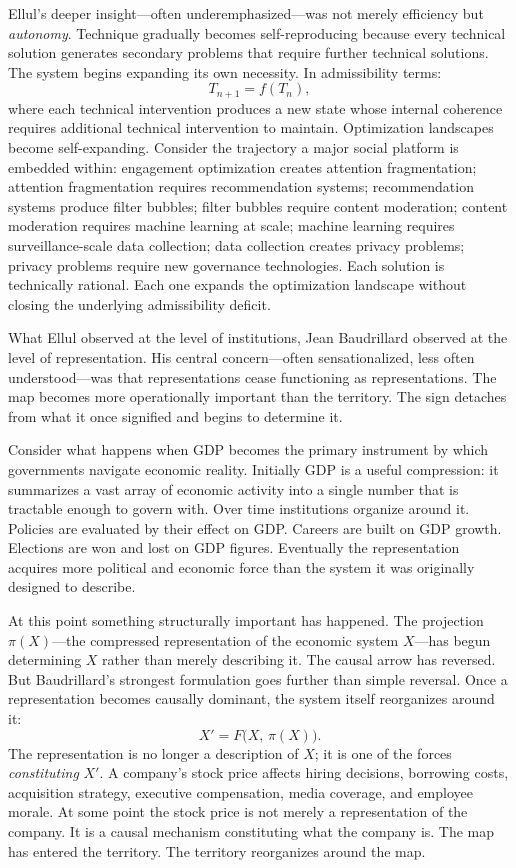 \documentclass[11pt, letterpaper]{article}
\begin{document}
Ellul's deeper insight---often underemphasized---was not merely efficiency but \emph{autonomy}. Technique gradually becomes self-reproducing because every technical solution generates secondary problems that require further technical solutions. The system begins expanding its own necessity. In admissibility terms:
\[
  T_{n+1} = f(T_n),
\]
where each technical intervention produces a new state whose internal coherence requires additional technical intervention to maintain. Optimization landscapes become self-expanding. Consider the trajectory a major social platform is embedded within: engagement optimization creates attention fragmentation; attention fragmentation requires recommendation systems; recommendation systems produce filter bubbles; filter bubbles require content moderation; content moderation requires machine learning at scale; machine learning requires surveillance-scale data collection; data collection creates privacy problems; privacy problems require new governance technologies. Each solution is technically rational. Each one expands the optimization landscape without closing the underlying admissibility deficit.

What Ellul observed at the level of institutions, Jean Baudrillard observed at the level of representation. His central concern---often sensationalized, less often understood---was that representations cease functioning as representations. The map becomes more operationally important than the territory. The sign detaches from what it once signified and begins to determine it.

Consider what happens when GDP becomes the primary instrument by which governments navigate economic reality. Initially GDP is a useful compression: it summarizes a vast array of economic activity into a single number that is tractable enough to govern with. Over time institutions organize around it. Policies are evaluated by their effect on GDP. Careers are built on GDP growth. Elections are won and lost on GDP figures. Eventually the representation acquires more political and economic force than the system it was originally designed to describe.

At this point something structurally important has happened. The projection $\pi(X)$---the compressed representation of the economic system $X$---has begun determining $X$ rather than merely describing it. The causal arrow has reversed. But Baudrillard's strongest formulation goes further than simple reversal. Once a representation becomes causally dominant, the system itself reorganizes around it:
\[
  X' = F\!\bigl(X,\, \pi(X)\bigr).
\]
The representation is no longer a description of $X$; it is one of the forces \emph{constituting} $X'$. A company's stock price affects hiring decisions, borrowing costs, acquisition strategy, executive compensation, media coverage, and employee morale. At some point the stock price is not merely a representation of the company. It is a causal mechanism constituting what the company is. The map has entered the territory. The territory reorganizes around the map.
\end{document}
